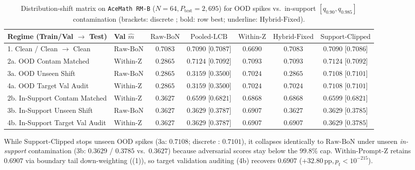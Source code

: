 \documentclass{article}
\theoremstyle{plain}
\theoremstyle{definition}
\theoremstyle{remark}
\begin{document}
\begin{table}[htbp]
\centering
\caption{Distribution-shift matrix on \texttt{AceMath RM-B} ($N=64, P_{\mathrm{test}}=2{,}695$) for OOD spikes vs.\ in-support $[q_{0.90}, q_{0.985}]$ contamination (brackets: discrete ; bold: row best; underline: $\mathrm{Hybrid\text{-}Fixed}$).}
\label{tab:shift}
\scriptsize
\setlength{\tabcolsep}{2.8pt}
\begin{tabular}{llccccc}
\toprule
Regime (Train/Val $\to$ Test) & Val $\hat{m}$ & $\mathrm{Raw\text{-}BoN}$ & $\mathrm{Pooled\text{-}LCB}$ & $\mathrm{Within\text{-}Z}$ & $\mathrm{Hybrid\text{-}Fixed}$ & $\mathrm{Support\text{-}Clipped}$ \\
\midrule
1. Clean / Clean $\to$ Clean              & $\mathrm{Raw\text{-}BoN}$  & $0.7083$ & $\mathbf{0.7090}$ [$0.7087$] & $0.6690$ & \underline{$0.7083$} & $\mathbf{0.7090}$ [$0.7086$] \\
2a. OOD Contam Matched                    & $\mathrm{Within\text{-}Z}$ & $0.2865$ & $\mathbf{0.7124}$ [$0.7092$] & $0.7093$ & \underline{$0.7093$} & $\mathbf{0.7124}$ [$0.7092$] \\
3a. OOD Unseen Shift                      & $\mathrm{Raw\text{-}BoN}$  & $0.2865$ & $0.3159$ [$0.3500$] & $0.7024$ & \underline{$0.2865$} & $\mathbf{0.7108}$ [$0.7101$] \\
4a. OOD Target Val Audit                  & $\mathrm{Within\text{-}Z}$ & $0.2865$ & $0.3159$ [$0.3500$] & $0.7024$ & \underline{$0.7024$} & $\mathbf{0.7108}$ [$0.7101$] \\
\midrule
2b. In-Support Contam Matched             & $\mathrm{Within\text{-}Z}$ & $0.3627$ & $0.6599$ [$0.6821$] & $\mathbf{0.6868}$ & \underline{$\mathbf{0.6868}$} & $0.6599$ [$0.6821$] \\
3b. In-Support Unseen Shift               & $\mathrm{Raw\text{-}BoN}$  & $0.3627$ & $0.3629$ [$0.3787$] & $\mathbf{0.6907}$ & \underline{$0.3627$} & $0.3629$ [$0.3785$] \\
4b. In-Support Target Val Audit           & $\mathrm{Within\text{-}Z}$ & $0.3627$ & $0.3629$ [$0.3787$] & $\mathbf{0.6907}$ & \underline{$\mathbf{0.6907}$} & $0.3629$ [$0.3785$] \\
\bottomrule
\end{tabular}
\end{table}

While $\mathrm{Support\text{-}Clipped}$ stops unseen OOD spikes (3a: $0.7108$; discrete : $0.7101$), it collapses identically to $\mathrm{Raw\text{-}BoN}$ under unseen \emph{in-support} contamination (3b: $0.3629$ / $0.3785$ vs.\ $0.3627$) because adversarial scores stay below the $99.8\%$ cap. $\mathrm{Within\text{-}Prompt\text{-}Z}$ retains $0.6907$ via boundary tail down-weighting ((1)), so target validation auditing (4b) recovers $0.6907$ ($+32.80\,\mathrm{pp}, p_t < 10^{-215}$).
\end{document}

